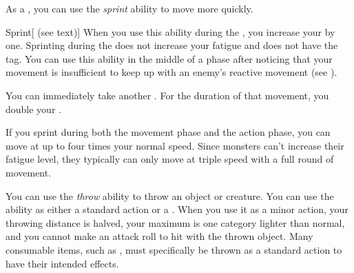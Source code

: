         \label{Sprint} As a , you can use the \textit{sprint} ability to move more quickly.

        \begin{activeability}{Sprint}[ (see text)]
            \rankline
            When you use this ability during the , you increase your  by one.
            Sprinting during the  does not increase your fatigue and does not have the  tag.
            You can use this ability in the middle of a phase after noticing that your movement is insufficient to keep up with an enemy's reactive movement (see ).

            You can immediately take another .
            For the duration of that movement, you double your .
        \end{activeability}

        If you sprint during both the movement phase and the action phase, you can move at up to four times your normal speed.
        Since monsters can't increase their fatigue level, they typically can only move at triple speed with a full round of movement.

        \label{Throw} You can use the \textit{throw} ability to throw an object or creature.
        You can use the ability as either a standard action or a .
        When you use it as a minor action, your throwing distance is halved, your maximum  is one category lighter than normal, and you cannot make an attack roll to hit with the thrown object.
        Many consumable items, such as , must specifically be thrown as a standard action to have their intended effects.

